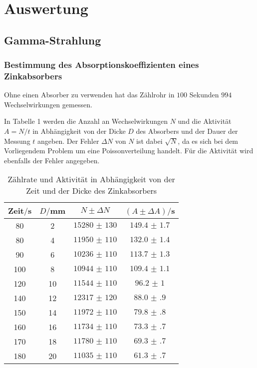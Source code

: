 \section{Auswertung}
\label{sec:Auswertung}

\subsection{Gamma-Strahlung}
\subsubsection{Bestimmung des Absorptionskoeffizienten eines Zinkabsorbers}
Ohne einen Absorber zu verwenden hat das Zählrohr in $100$ Sekunden $994$ Wechselwirkungen gemessen.

In Tabelle 1 werden die Anzahl an Wechselwirkungen $N$ und die Aktivität $A = N/t$ in Abhängigkeit von der Dicke $D$ des Absorbers und der
Dauer der Messung $t$ angeben. Der Fehler $\Delta N$ von $N$ ist dabei $\sqrt{N}$, da es sich bei dem Vorliegendem Problem um eine
Poissonverteilung handelt. Für die Aktivität wird ebenfalls der Fehler angegeben.

\begin{table}[H]
  \centering
  \caption{Zählrate und Aktivität in Abhängigkeit von der Zeit und der Dicke des Zinkabsorbers}
  \label{tab:Rechteckspannung}
  \begin{tabular}{c c c c}
    \toprule
    Zeit$/$s & $D/$mm & $N \pm \Delta N$ & $(A \pm \Delta A)/$s\\
    \midrule
    80 & 2 & $\num{15280(130)}$  &  $\num{149.4(17)}$ \\
    80 & 4 & $\num{11950(110)}$ &   $\num{132.0(14)}$ \\
    90 & 6 & $\num{10236(110)}$ &   $\num{113.7(13)}$ \\
    100 & 8 & $\num{10944(110)}$ &  $\num{109.4(11)}$ \\
    120 & 10 & $\num{11544(110)}$ & $\num{96.2(10)}$ \\
    140 & 12 & $\num{12317(120)}$ & $\num{88.0(9)}$ \\
    150 & 14 & $\num{11972(110)}$ & $\num{79.8(8)}$ \\
    160 & 16 & $\num{11734(110)}$ & $\num{73.3(7)}$ \\
    170 & 18 & $\num{11780(110)}$ & $\num{69.3(7)}$ \\
    180 & 20 & $\num{11035(110)}$ & $\num{61.3(7)}$ \\
    \bottomrule
  \end{tabular}
\end{table}

